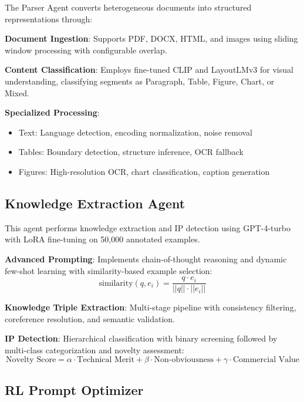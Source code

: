 \documentclass[11pt,a4paper]{article}
\begin{document}
The Parser Agent converts heterogeneous documents into structured representations through:

\textbf{Document Ingestion}: Supports PDF, DOCX, HTML, and images using sliding window processing with configurable overlap.

\textbf{Content Classification}: Employs fine-tuned CLIP \citep{radford2021learning} and LayoutLMv3 for visual understanding, classifying segments as Paragraph, Table, Figure, Chart, or Mixed.

\textbf{Specialized Processing}: 
\begin{itemize}
  \item Text: Language detection, encoding normalization, noise removal
  \item Tables: Boundary detection, structure inference, OCR fallback
  \item Figures: High-resolution OCR, chart classification, caption generation
\end{itemize}

\subsection{Knowledge Extraction Agent}

This agent performs knowledge extraction and IP detection using GPT-4-turbo with LoRA fine-tuning \citep{hu2021lora} on 50,000 annotated examples.

\textbf{Advanced Prompting}: Implements chain-of-thought reasoning and dynamic few-shot learning with similarity-based example selection:
\begin{equation}
\text{similarity}(q, e_i) = \frac{q \cdot e_i}{||q|| \cdot ||e_i||}
\end{equation}

\textbf{Knowledge Triple Extraction}: Multi-stage pipeline with consistency filtering, coreference resolution, and semantic validation.

\textbf{IP Detection}: Hierarchical classification with binary screening followed by multi-class categorization and novelty assessment:
\begin{equation}
\text{Novelty Score} = \alpha \cdot \text{Technical Merit} + \beta \cdot \text{Non-obviousness} + \gamma \cdot \text{Commercial Value}
\end{equation}

\subsection{RL Prompt Optimizer}
\end{document}
